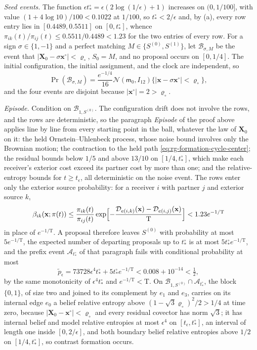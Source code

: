 \emph{Seed events.} The function
\(\epsilon t^\circ_*=\epsilon(2\log(1/\epsilon)+1)\) increases on
\((0,1/100]\), with value \((1+4\log10)/100<0.1022\) at \(1/100\), so
\(t^\circ_*<2/\epsilon\) and, by (a), every row entry lies in
\([0.4489,0.5511]\) on \([0,t^\circ_*]\), whence
\(\pi_{ik}(t)/\pi_{ij}(t)\le0.5511/0.4489<1.23\) for the two entries of every
row. For a sign
\(\sigma\in\{1,-1\}\) and a perfect matching \(M\in\{S^{(0)},S^{(1)}\}\), let
\(\mathscr B_{\sigma,M}\) be the event that
\(|\mathbf X_0-\sigma\mathbf x^\circ|<\varrho_\circ\), \(S_0=M\), and no proposal
occurs on \([0,1/4]\). The initial configuration, the initial assignment, and
the clock are independent, so
\[
\Pr(\mathscr B_{\sigma,M})=\frac{e^{-1/4}}{16}\mathcal N(\mathsf m_0,I_{12})
\bigl\{|\mathbf x-\sigma\mathbf x^\circ|<\varrho_\circ\bigr\},
\]
and the four events are disjoint because \(|\mathbf x^\circ|=2>\varrho_\circ\).

\emph{Episode.} Condition on \(\mathscr B_{1,S^{(0)}}\). The configuration drift
does not involve the rows, and the rows are deterministic, so the paragraph
\emph{Episode} of the proof above applies line by line from every starting
point in the ball, whatever the law of \(\mathbf X_0\) on it: the held
Ornstein--Uhlenbeck process, whose noise bound involves only the Brownian
motion; the contraction to the held path \cref{eq:rg-formation-cycle-center};
the residual bounds below \(1/5\) and above \(13/10\) on \([1/4,t^\circ_*]\),
which make each receiver's exterior cost exceed its partner cost by more than
one; and the relative-entropy bounds for \(t\ge t_\epsilon\), all deterministic
on the noise event. The rows enter only the exterior source probability: for a
receiver \(i\) with partner \(j\) and exterior source \(k\),
\[
\beta_{ik}(\mathbf x;\pi(t))\le\frac{\pi_{ik}(t)}{\pi_{ij}(t)}
\exp\Bigl[-\frac{\mathcal D_{e(i,k)}(\mathbf x)-\mathcal D_{e(i,j)}(\mathbf x)}{\mathrm T}\Bigr]
<1.23 e^{-1/\mathrm T}
\]
in place of \(e^{-1/\mathrm T}\). A proposal therefore leaves \(S^{(0)}\) with
probability at most \(5e^{-1/\mathrm T}\), the expected number of departing
proposals up to \(t^\circ_*\) is at most \(5t^\circ_*e^{-1/\mathrm T}\), and the
prefix event \(\mathscr A_{t^\circ_*}\) of that paragraph fails with conditional
probability at most
\[
\tilde p_\epsilon=73728 \epsilon^4t^\circ_*+5t^\circ_*e^{-1/\mathrm T}
<0.008+10^{-14}<\tfrac12,
\]
by the same monotonicity of \(\epsilon^4t^\circ_*\) and
\(e^{-1/\mathrm T}<\mathrm T\). On
\(\mathscr B_{1,S^{(0)}}\cap\mathscr A_{t^\circ_*}\), the block \(\{0,1\}\), of
size two and joined to its complement by \(e_1\) and \(e_3\), carries on its
internal edge \(e_0\) a belief relative entropy above
\((1-\sqrt3\varrho_\circ)^2/2>1/4\) at time zero, because
\(|\mathbf X_0-\mathbf x^\circ|<\varrho_\circ\) and every residual covector
has norm \(\sqrt3\); it has internal belief and model relative entropies at
most \(\epsilon^4\) on \([t_\epsilon,t^\circ_*]\), an interval of length one
inside \([0,2/\epsilon]\), and both boundary belief relative entropies above
\(1/2\) on \([1/4,t^\circ_*]\), so contrast formation occurs.

